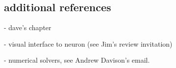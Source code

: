 \documentclass[12pt]{article}
\begin{document}
\subsection*{additional references}

- dave's chapter

- visual interface to neuron (see Jim's review invitation)

- numerical solvers, see Andrew Davison's email.





\end{document}
